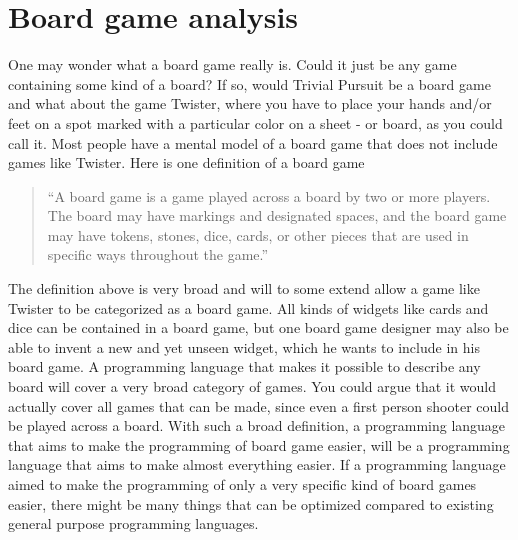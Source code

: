 \section{Board game analysis}
\label{sec:board-game-analysis}

One may wonder what a board game really is. 
Could it just be any game containing some kind of a board? 
If so, would Trivial Pursuit be a board game and what about the game Twister, where you have to place your hands and/or feet on a spot marked with a particular color on a sheet - or board, as you could call it.
Most people have a mental model of a board game that does not include games like Twister. Here is one definition of a board game

\begin{quote}
``A board game is a game played across a board by two or more players. The board may have markings and designated spaces, and the board game may have tokens, stones, dice, cards, or other pieces that are used in specific ways throughout the game.'' \cite{def-board-game}
\end{quote}

The definition above is very broad and will to some extend allow a game like Twister to be categorized as a board game. 
All kinds of widgets like cards and dice can be contained in a board game, but one board game designer may also be able to invent a new and yet unseen widget, which he wants to include in his board game. 
A programming language that makes it possible to describe any board will cover a very broad category of games. 
You could argue that it would actually cover all games that can be made, since even a first person shooter could be played across a board.
With such a broad definition, a programming language that aims to make the programming of board game easier, will be a programming language that aims to make almost everything easier.
If a programming language aimed to make the programming of only a very specific kind of board games easier, there might be many things that can be optimized compared to existing general purpose programming languages.
